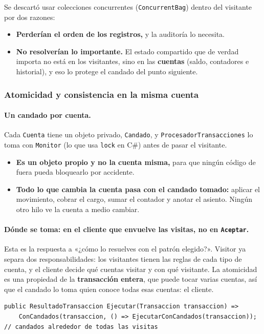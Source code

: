 Se descartó usar colecciones concurrentes (\texttt{ConcurrentBag}) dentro del visitante por
dos razones:
\begin{itemize}
  \item \textbf{Perderían el orden de los registros,} y la auditoría lo necesita.
  \item \textbf{No resolverían lo importante.} El estado compartido que de verdad importa no
        está en los visitantes, sino en las \textbf{cuentas} (saldo, contadores e historial),
        y eso lo protege el candado del punto siguiente.
\end{itemize}

\subsubsection{Atomicidad y consistencia en la misma cuenta}

\paragraph{Un candado por cuenta.}
Cada \texttt{Cuenta} tiene un objeto privado, \texttt{Candado}, y
\texttt{ProcesadorTransacciones} lo toma con \texttt{Monitor} (lo que usa \texttt{lock} en
C\#) antes de pasar el visitante.
\begin{itemize}
  \item \textbf{Es un objeto propio y no la cuenta misma,} para que ningún código de fuera
        pueda bloquearlo por accidente.
  \item \textbf{Todo lo que cambia la cuenta pasa con el candado tomado:} aplicar el
        movimiento, cobrar el cargo, sumar el contador y anotar el asiento. Ningún otro hilo
        ve la cuenta a medio cambiar.
\end{itemize}

\paragraph{Dónde se toma: en el cliente que envuelve las visitas, no en \texttt{Aceptar}.}
Esta es la respuesta a «¿cómo lo resuelves con el patrón elegido?». Visitor ya separa dos
responsabilidades: los visitantes tienen las reglas de cada tipo de cuenta, y el cliente decide
qué cuentas visitar y con qué visitante. La atomicidad es una propiedad de la
\textbf{transacción entera}, que puede tocar varias cuentas, así que el candado lo toma quien
conoce todas esas cuentas: el cliente.

\begin{lstlisting}[basicstyle=\ttfamily\footnotesize, columns=fullflexible, keepspaces=true]
public ResultadoTransaccion Ejecutar(Transaccion transaccion) =>
    ConCandados(transaccion, () => EjecutarConCandados(transaccion));   // candados alrededor de todas las visitas
\end{lstlisting}

